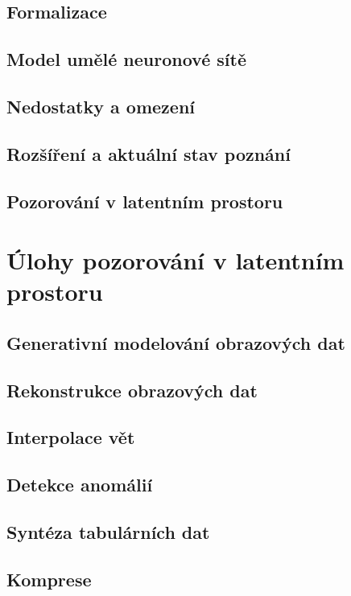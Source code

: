 \documentclass[11pt,a4paper]{report}
\begin{document}
\section{Formalizace}
\section{Model umělé neuronové sítě}
\section{Nedostatky a omezení}
\section{Rozšíření a aktuální stav poznání}
\section{Pozorování v latentním prostoru}


\chapter{Úlohy pozorování v latentním prostoru}
\label{chap:applications}
\section{Generativní modelování obrazových dat}
\section{Rekonstrukce obrazových dat}
\section{Interpolace vět}
\section{Detekce anomálií}
\section{Syntéza tabulárních dat}
\section{Komprese}
\end{document}
